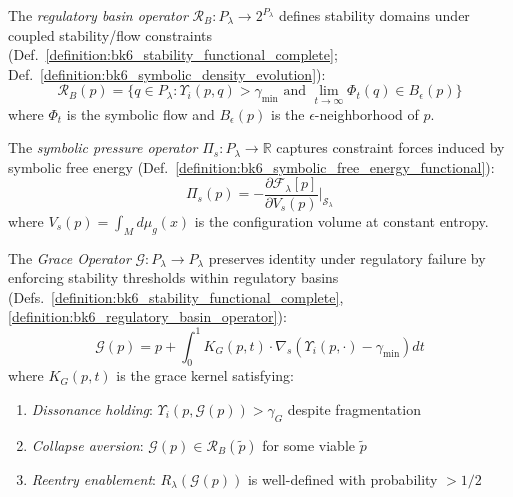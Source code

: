 \begin{definition}
\label{definition:bk6_regulatory_basin_operator}
The \emph{regulatory basin operator} $\mathcal{R}_B : P_\lambda \to 2^{P_\lambda}$ defines stability domains under coupled stability/flow constraints (Def.~\ref{definition:bk6_stability_functional_complete}; Def.~\ref{definition:bk6_symbolic_density_evolution}):
\begin{equation}
\mathcal{R}_B(p) = \{q \in P_\lambda : \Upsilon_i(p,q) > \gamma_{\min} \text{ and } \lim_{t \to \infty} \Phi_t(q) \in B_\epsilon(p)\}
\end{equation}
where $\Phi_t$ is the symbolic flow and $B_\epsilon(p)$ is the $\epsilon$-neighborhood of $p$.
\end{definition}

\begin{definition}
\label{definition:bk6_symbolic_pressure_operator}
The \emph{symbolic pressure operator} $\Pi_s : P_\lambda \to \mathbb{R}$ captures constraint forces induced by symbolic free energy (Def.~\ref{definition:bk6_symbolic_free_energy_functional}):
\begin{equation}
\Pi_s(p) = -\frac{\partial \mathcal{F}_\lambda[p]}{\partial V_s(p)}\bigg|_{\mathcal{S}_\lambda}
\end{equation}
where $V_s(p) = \int_M d\mu_g(x)$ is the configuration volume at constant entropy.
\end{definition}

\begin{definition}
\label{definition:bk6_grace_operator_complete}
The \emph{Grace Operator} $\mathcal{G} : P_{\lambda} \to P_{\lambda}$ preserves identity under regulatory failure by enforcing stability thresholds within regulatory basins (Defs.~\ref{definition:bk6_stability_functional_complete}, \ref{definition:bk6_regulatory_basin_operator}):
\begin{equation}
\mathcal{G}(p) = p + \int_0^1 K_G(p,t) \cdot \nabla_s \left( \Upsilon_i(p, \cdot) - \gamma_{\min} \right) dt
\end{equation}
where $K_G(p,t)$ is the grace kernel satisfying:
\begin{enumerate}
\item \emph{Dissonance holding}: $\Upsilon_i(p, \mathcal{G}(p)) > \gamma_G$ despite fragmentation
\item \emph{Collapse aversion}: $\mathcal{G}(p) \in \mathcal{R}_B(\tilde{p})$ for some viable $\tilde{p}$
\item \emph{Reentry enablement}: $R_\lambda(\mathcal{G}(p))$ is well-defined with probability $> 1/2$
\end{enumerate}
\end{definition}


